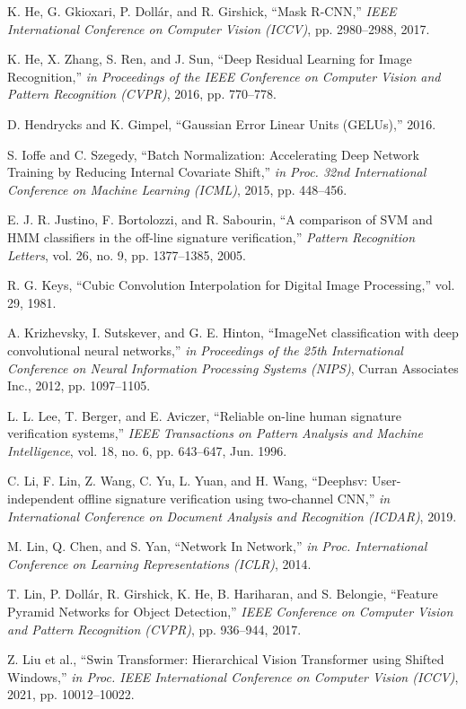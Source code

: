 \begin{thebibliography}{10}
K. He, G. Gkioxari, P. Dollár, and R. Girshick, ``Mask R-CNN,'' {\em IEEE International Conference on Computer Vision (ICCV)}, pp. 2980--2988,
2017.

K. He, X. Zhang, S. Ren, and J. Sun, ``Deep Residual Learning for Image Recognition,'' {\em in Proceedings of the IEEE Conference on Computer Vision and Pattern Recognition (CVPR)},
2016, pp. 770--778.

D. Hendrycks and K. Gimpel, ``Gaussian Error Linear Units (GELUs),''
2016.

S. Ioffe and C. Szegedy, ``Batch Normalization: Accelerating Deep Network Training by Reducing Internal Covariate Shift,'' {\em in Proc. 32nd International Conference on Machine Learning (ICML)},
2015, pp. 448--456.

E. J. R. Justino, F. Bortolozzi, and R. Sabourin, ``A comparison of SVM and HMM classifiers in the off-line signature verification,'' {\em Pattern Recognition Letters}, vol. 26, no. 9, pp. 1377--1385,
2005.

R. G. Keys, ``Cubic Convolution Interpolation for Digital Image Processing,'' vol. 29,
1981.

A. Krizhevsky, I. Sutskever, and G. E. Hinton, ``ImageNet classification with deep convolutional neural networks,'' {\em in Proceedings of the 25th International Conference on Neural Information Processing Systems (NIPS)}, Curran Associates Inc.,
2012, pp. 1097--1105.

L. L. Lee, T. Berger, and E. Aviczer, ``Reliable on-line human signature verification systems,'' {\em IEEE Transactions on Pattern Analysis and Machine Intelligence}, vol. 18, no. 6, pp. 643--647,
Jun. 1996.

C. Li, F. Lin, Z. Wang, C. Yu, L. Yuan, and H. Wang, ``Deephsv: User-independent offline signature verification using two-channel CNN,'' {\em in International Conference on Document Analysis and Recognition (ICDAR)},
2019.

M. Lin, Q. Chen, and S. Yan, ``Network In Network,'' {\em in Proc. International Conference on Learning Representations (ICLR)},
2014.

T. Lin, P. Dollár, R. Girshick, K. He, B. Hariharan, and S. Belongie, ``Feature Pyramid Networks for Object Detection,'' {\em IEEE Conference on Computer Vision and Pattern Recognition (CVPR)}, pp. 936--944,
2017.

Z. Liu et al., ``Swin Transformer: Hierarchical Vision Transformer using Shifted Windows,'' {\em in Proc. IEEE International Conference on Computer Vision (ICCV)},
2021, pp. 10012--10022.


\end{thebibliography}
